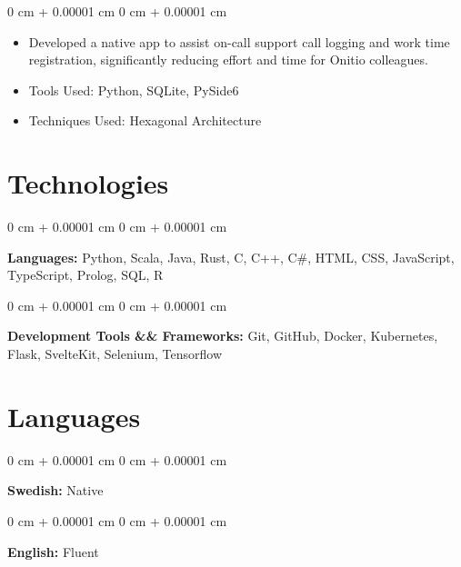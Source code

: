 \documentclass[10pt, letterpaper]{article}
\newenvironment{highlights}{
    \begin{itemize}[
        topsep=0.10 cm,
        parsep=0.10 cm,
        partopsep=0pt,
        itemsep=0pt,
        leftmargin=0 cm + 10pt
    ]
}{
    \end{itemize}
} %
\newenvironment{onecolentry}{
    \begin{adjustwidth}{
        0 cm + 0.00001 cm
    }{
        0 cm + 0.00001 cm
    }
}{
    \end{adjustwidth}
} %
\begin{document}
        \vspace{0.10 cm}
        \begin{onecolentry}
            \begin{highlights}
                \item Developed a native app to assist on-call support call logging and work time registration, significantly reducing effort and time for Onitio colleagues.
                \item Tools Used: Python, SQLite, PySide6
                \item Techniques Used: Hexagonal Architecture
            \end{highlights}
        \end{onecolentry}



    
    \section{Technologies}



        
        \begin{onecolentry}
            \textbf{Languages:} Python, Scala, Java, Rust, C, C++, C\#, HTML, CSS, JavaScript, TypeScript, Prolog, SQL, R
        \end{onecolentry}

        \vspace{0.2 cm}

        \begin{onecolentry}
            \textbf{Development Tools \&\& Frameworks:} Git, GitHub, Docker, Kubernetes, Flask, SvelteKit, Selenium, Tensorflow
        \end{onecolentry}


    
    \section{Languages}



        
        \begin{onecolentry}
            \textbf{Swedish:} Native
        \end{onecolentry}

        \vspace{0.2 cm}

        \begin{onecolentry}
            \textbf{English:} Fluent
        \end{onecolentry}


    
\end{document}
